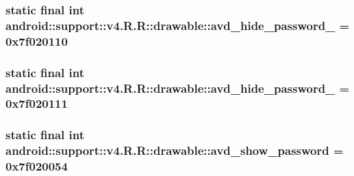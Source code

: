\hypertarget{classandroid_1_1support_1_1v4_1_1_r_1_1drawable_02ae034db4d7557d38d612b8a12759cb}{
\subsubsection[{avd\_\-hide\_\-password\_\-2}]{\setlength{\rightskip}{0pt plus 5cm}static final int android::support::v4.R.R::drawable::avd\_\-hide\_\-password\_ = 0x7f020110}}
\label{classandroid_1_1support_1_1v4_1_1_r_1_1drawable_02ae034db4d7557d38d612b8a12759cb}


\hypertarget{classandroid_1_1support_1_1v4_1_1_r_1_1drawable_5064cf6b6d036321532281f071e49abd}{
\subsubsection[{avd\_\-hide\_\-password\_\-3}]{\setlength{\rightskip}{0pt plus 5cm}static final int android::support::v4.R.R::drawable::avd\_\-hide\_\-password\_ = 0x7f020111}}
\label{classandroid_1_1support_1_1v4_1_1_r_1_1drawable_5064cf6b6d036321532281f071e49abd}


\hypertarget{classandroid_1_1support_1_1v4_1_1_r_1_1drawable_bc08a2ec58900bfa0f889c5e889da94d}{
\subsubsection[{avd\_\-show\_\-password}]{\setlength{\rightskip}{0pt plus 5cm}static final int android::support::v4.R.R::drawable::avd\_\-show\_\-password = 0x7f020054}}
\label{classandroid_1_1support_1_1v4_1_1_r_1_1drawable_bc08a2ec58900bfa0f889c5e889da94d}



